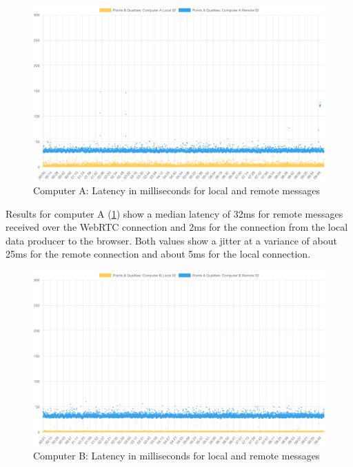 \begin{figure}[h]
\centering
\includegraphics[scale=0.4]{04_Artefakte/01_Abbildungen/latency-computer-a-02}
\caption[Message latency on Computer A]{Computer A: Latency in milliseconds for local and remote messages\protect}
\label{fig:latencyComputerA}
\end{figure}

Results for computer A (\ref{fig:latencyComputerA}) show a median latency of 32ms for remote messages received over the WebRTC connection and 2ms for the connection from the local data producer to the browser.
Both values show a jitter at a variance of about 25ms for the remote connection and about 5ms for the local connection.

\begin{figure}[h]
\centering
\includegraphics[scale=0.4]{04_Artefakte/01_Abbildungen/latency-computer-b-02}
\caption[Message latency on Computer B]{Computer B: Latency in milliseconds for local and remote messages\protect}
\label{fig:latencyComputerB}
\end{figure}

